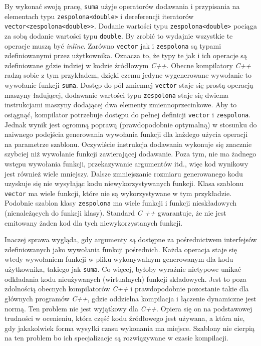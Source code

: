 \documentclass[11pt, a4paper]{article}
\begin{document}
By wykonać swoją pracę, \verb#suma# użyje operatorów dodawania i przypisania na elementach typu \verb#zespolona<double># i dereferencji iteratorów \verb#vector<zespolona<double>>#.  Dodanie wartości typu \verb#zespolona<double># pociąga za sobą dodanie wartości typu \verb#double#. By zrobić to wydajnie wszystkie te operacje muszą być \emph{inline}.  Zarówno \verb#vector# jak i \verb#zespolona# są typami zdefiniowanymi przez użytkownika. Oznacza to, że typy te jak i ich operacje są zdefiniowane gdzie indziej w kodzie źródłowym \emph{C++}. Obecne kompilatory \emph{C++} radzą sobie z tym przykładem, dzięki czemu jedyne wygenerowane wywołanie to wywołanie funkcji \verb#suma#. Dostęp do pól zmiennej \verb#vector# staje się prostą operacją maszyny ładującej, dodawanie wartości typu \verb#zespolona# staje się dwiema instrukcjami maszyny dodającej dwa elementy zmiennoprzecinkowe. Aby to osiągnąć, kompilator potrzebuje dostępu do pełnej definicji \verb#vector# i \verb#zespolona#. Jednak wynik jest ogromną poprawą (prawdopodobnie optymalną) w stosunku do naiwnego podejścia generowania wywołania funkcji dla każdego użycia operacji na parametrze szablonu. Oczywiście instrukcja dodawania wykonuje się znacznie szybciej niż wywołanie funkcji zawierającej dodawanie. Poza tym, nie ma żadnego wstępu wywołania funkcji, przekazywanie argumentów itd., więc kod wynikowy jest również wiele mniejszy. Dalsze zmniejszanie rozmiaru generowanego kodu uzyskuje się nie wysyłając kodu niewykorzystywanych funkcji. Klasa szablonu \verb#vector# ma wiele funkcji, które nie są wykorzystywane w tym przykładzie. Podobnie szablon klasy \verb#zespolona# ma wiele funkcji i funkcji nieskładowych (nienależących do funkcji klasy). Standard \emph{C ++} gwarantuje, że nie jest emitowany żaden kod dla tych niewykorzystanych funkcji. 

Inaczej sprawa wygląda, gdy argumenty są dostępne za pośrednictwem interfejsów zdefiniowanych jako wywołania funkcji pośrednich. Każda operacja staje się wtedy wywołaniem funkcji w pliku wykonywalnym generowanym dla kodu użytkownika, takiego jak \verb#suma#. Co więcej, byłoby wyraźnie nietypowe unikać odkładania kodu nieużywanych (wirtualnych) funkcji składowych. Jest to poza zdolnością obecnych kompilatorów \emph{C++} i prawdopodobnie pozostanie takie dla głównych programów \emph{C++}, gdzie oddzielna kompilacja i łączenie dynamiczne jest normą. Ten problem nie jest wyjątkowy dla \emph{C++}. Opiera się on na podstawowej trudności w ocenieniu, która część kodu źródłowego jest używana, a która nie, gdy jakakolwiek forma wysyłki czasu wykonania ma miejsce. Szablony nie cierpią na ten problem bo ich specjalizacje są rozwiązywane w czasie kompilacji.
\end{document}
